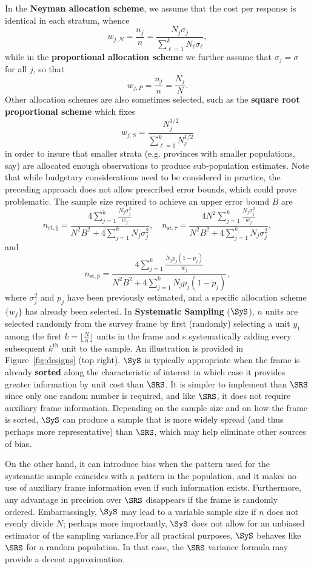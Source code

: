 In the \textbf{Neyman allocation scheme}, we assume that the cost per response is identical in each stratum, whence 
$$w_{j,N}=\frac{n_j}{n}=\frac{N_j\sigma_j}{\sum_{\ell=1}^kN_{\ell}\sigma_{\ell}},$$ while in the \textbf{proportional allocation scheme} we further assume that $\sigma_j=\sigma$ for all $j$, so that $$w_{j,P}=\frac{n_j}{n}=\frac{N_j}{N}.$$ Other allocation schemes are also sometimes selected, such as the \textbf{square root proportional scheme} which fixes $$w_{j,S}=\frac{N_j^{1/2}}{\sum_{\ell=1}^kN_{\ell}^{1/2}}$$ in order to insure that smaller strata (e.g. provinces with smaller populations, say) are allocated enough observations to produce sub-population estimates. \newl Note that while budgetary considerations need to be considered in practice, the preceding approach does not allow prescribed error bounds, which could prove problematic. The sample size required to achieve an upper error bound $B$ are\small $$n_{\textrm{st},\overline{y}}=\frac{4\sum_{j=1}^k\frac{N_j\sigma_j^2}{w_j}}{N^2B^2+4\sum_{j=1}^kN_j\sigma_j^2},\quad n_{\textrm{st},\hat{\tau}}=\frac{4N^2\sum_{j=1}^k\frac{N_j\sigma_j^2}{w_j}}{N^2B^2+4\sum_{j=1}^kN_j\sigma_j^2},$$ and $$n_{\textrm{st},\hat{p}}=\frac{4\sum_{j=1}^k\frac{N_jp_j(1-p_j)}{w_j}}{N^2B^2+4\sum_{j=1}^kN_jp_j(1-p_j)},$$ \normalsize where $\sigma_j^2$ and $p_j$ have been previously estimated, and a specific allocation scheme  $\{w_j\}$ has already been selected. \newl 
In \textbf{Systematic Sampling} ($\SyS$), $n$ units are selected randomly from the survey frame by first (randomly) selecting a unit $y_1$ among the first $k=\lfloor\frac{N}{n}\rfloor$ units in the frame and s systematically adding every subsequent $k^{\textrm{th}}$ unit to the sample. An illustration is provided in Figure~\ref{fig:designs} (top right). \newl $\SyS$ is typically appropriate when the frame is already \textbf{sorted} along the characteristic of interest in which case it provides greater information by unit cost than $\SRS$. It is simpler to implement than $\SRS$ since only one random number is required, and like $\SRS$, it does not require auxiliary frame information. Depending on the sample size and on how the frame is sorted, $\SyS$ can produce a sample that is more widely spread (and thus perhaps more representative) than $\SRS$, which may help eliminate other sources of bias.\par On the other hand, it can introduce bias when the pattern used for the systematic sample coincides with a pattern in the population, and it makes no use of auxiliary frame information even if such information exists. Furthermore, any advantage in precision over $\SRS$ disappears if the frame is randomly ordered. Embarrassingly, $\SyS$ may lead to a variable sample size if $n$ does not evenly divide $N$; perhaps more importantly, $\SyS$ does not allow for an unbiased estimator of the sampling variance.\newl For all practical purposes, $\SyS$ behaves like $\SRS$ for a random population. In that case, the $\SRS$ variance  formula may provide a decent approximation. 
